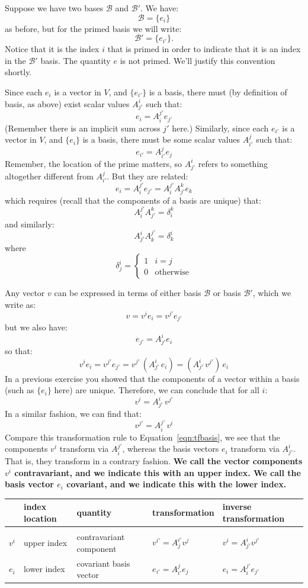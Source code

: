 \documentclass[12pt]{article}
\begin{document}
\noindent
Suppose we have two bases $\mathcal{B}$ and $\mathcal{B}'$.  We have:
$$\mathcal{B} = \{e_i\}$$
as before, but for the primed basis we will write:
$$\mathcal{B}' = \{e_{i'}\}.$$
Notice that it is the index $i$ that is primed in order to indicate
that it is an index in the $\mathcal{B}'$ basis.  The quantity $e$ is
not primed.  We'll justify this convention shortly.

Since each $e_i$ is a vector in $V$, and $\{e_{i'}\}$ is a basis,
there must (by definition of basis, as above) exist scalar values
$A^i_{j'}$ such that:
$$e_i = A^{j'}_i e_{j'}$$
(Remember there is an implicit sum across $j'$ here.)  Similarly,
since each $e_{i'}$ is a vector in $V$, and $\{e_i\}$ is a basis,
there must be some scalar values $A^{j}_{i'}$ such that:
$$e_{i'} = A^{j}_{i'} e_j$$
Remember, the location of the prime matters, so $A^{i}_{j'}$ refers to something altogether different from $A^{j}_{i'}$.  But they are related:
$$e_i = A^{j'}_{i} e_{j'} = A^{j'}_i A^{k}_{j'}e_{k}$$
which requires (recall that the components of a basis are unique) that:
$$A^{j'}_i A^{k}_{j'} = \delta^k_i$$
and similarly:
$$A^i_{j'} A^{j'}_k = \delta^i_k$$
where
$$\delta^i_j = \begin{cases} 1 & i=j \\ 0 & \text{otherwise}\end{cases}$$

Any vector $v$ can be expressed in terms of either basis $\mathcal{B}$
or basis $\mathcal{B}'$, which we write as:
$$v = v^{i}e_{i} = v^{j'}e_{j'}$$
but we also have:
\begin{equation}
\label{eqn:tfbasis}
e_{j'} = A^{i}_{j'} e_i
\end{equation}
so that:
$$v^{i}e_{i} = v^{j'}e_{j'} = v^{j'} \, (A^{i}_{j'} \, e_i) = (A^{i}_{j'} \, v^{j'}) \, e_i$$
In a previous exercise you showed that the components of a vector within a basis (such as $\{e_i\}$ here) are unique.  Therefore, we can conclude that for all $i$:
$$v^{i} = A^{i}_{j'} \, v^{j'}$$
In a similar fashion, we can find that:
$$v^{j'} = A^{j'}_{i} \, v^{i}$$
Compare this transformation rule to Equation~\ref{eqn:tfbasis}, we see that the components $v^i$ transform via $A^{j'}_i$, whereas the basis vectors $e_i$ transform via $A^{i}_{j'}$.  That is, they transform in a contrary fashion.  {\bf We call the vector components $v^i$ contravariant, and we indicate this with an upper index.  We call the basis vector $e_i$ covariant, and we indicate this with the lower index.}
\begin{center}
\begin{tabular}{lllll}
 & index location & quantity & transformation & inverse transformation \\
  \hline \\[-11pt]
$v^i$ & upper index & contravariant component & $v^{i'} = A^{i'}_{j} v^{j}$ & $v^{i} = A^{i}_{j'} v^{j'}$ \\[5pt]
$e_i$ & lower index & covariant basis vector & $e_{i'} = A^{j}_{i'} e_{j}$ & $e_{i} = A^{j'}_{i} e_{j'}$ \\
\end{tabular}
\end{center}
\end{document}
